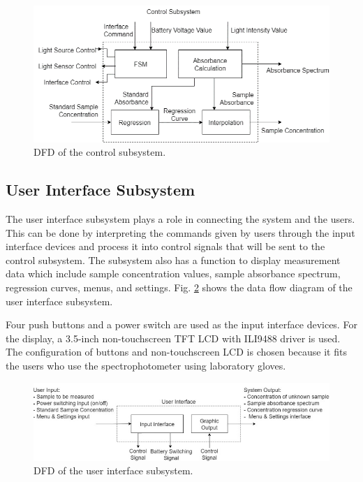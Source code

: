 \documentclass[conference]{IEEEtran}
\begin{document}
    \begin{figure}[htbp]
    \centerline{\includegraphics{control-dfd.png}}
    \caption{DFD of the control subsystem.}
    \label{control-dfd}
    \end{figure}

\subsection{User Interface Subsystem}
The user interface subsystem plays a role in connecting the system and the users. This can be done by interpreting the commands given by users through the input interface devices and process it into control signals that will be sent to the control subsystem. The subsystem also has a function to display measurement data which include sample concentration values, sample absorbance spectrum, regression curves, menus, and settings. Fig. \ref{ui-dfd} shows the data flow diagram of the user interface subsystem.

Four push buttons and a power switch are used as the input interface devices. For the display, a 3.5-inch non-touchscreen TFT LCD with ILI9488 driver is used. The configuration of buttons and non-touchscreen LCD is chosen because it fits the users who use the spectrophotometer using laboratory gloves.

    \begin{figure}[htbp]
    \centerline{\includegraphics[scale=0.43]{ui-dfd.png}}
    \caption{DFD of the user interface subsystem.}
    \label{ui-dfd}
    \end{figure}
\end{document}
